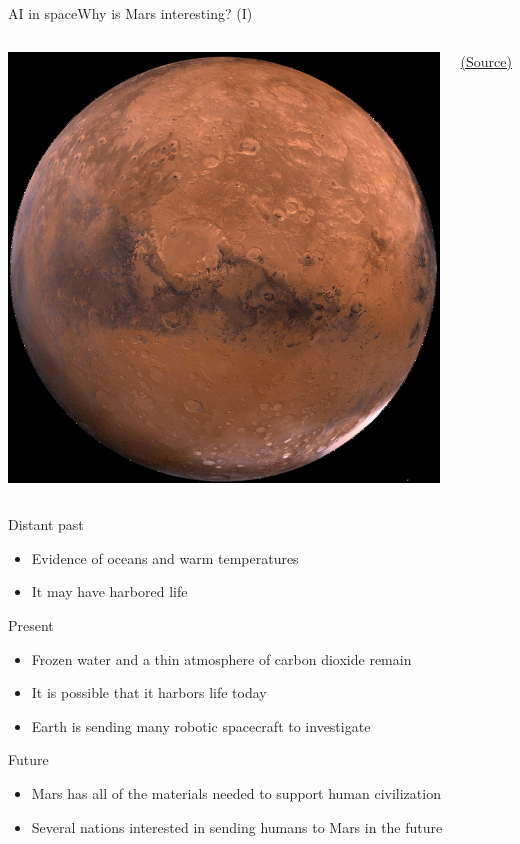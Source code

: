 \documentclass[10pt,compress]{beamer} %
\begin{document}
{\begin{frame}{AI in space}{Why is Mars interesting? (I)}
{\begin{columns}
	   			\vspace{0.5cm}
				\includegraphics[width=\linewidth]{figs/marte-small.jpg}\\
				\vspace{-0.4cm}
				\begin{center}
				\tiny{\href{https://journalismfrommars.co.uk/}{(Source)}}
				\end{center}
		\end{columns}
		\vspace{-0.5cm}
		Distant past
		\begin{itemize}
			\item Evidence of oceans and warm temperatures
			\item It may have harbored life
		\end{itemize}
		Present
		\begin{itemize}
			\item Frozen water and a thin atmosphere of carbon dioxide remain
			\item It is possible that it harbors life today
			\item Earth is sending many robotic spacecraft to investigate
		\end{itemize}
		Future
		\begin{itemize}
			\item Mars has all of the materials needed to support human civilization
			\item Several nations interested in sending humans to Mars in the future
		\end{itemize}
		}
	\end{frame}

}
\end{document}
